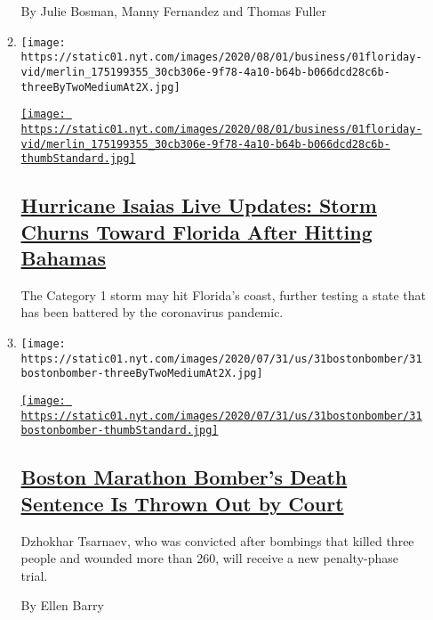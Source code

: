 \begin{enumerate}
\begin{enumerate}
    By Julie Bosman, Manny Fernandez and Thomas Fuller
  \item
    \texttt{[image: https://static01.nyt.com/images/2020/08/01/business/01floriday-vid/merlin\_175199355\_30cb306e-9f78-4a10-b64b-b066dcd28c6b-threeByTwoMediumAt2X.jpg]}

    \href{/2020/08/01/us/hurricane-isaias-updates.html}{\texttt{[image: https://static01.nyt.com/images/2020/08/01/business/01floriday-vid/merlin\_175199355\_30cb306e-9f78-4a10-b64b-b066dcd28c6b-thumbStandard.jpg]}}

    \hypertarget{hurricane-isaias-live-updates-storm-churns-toward-florida-after-hitting-bahamas}{%
    \subsection{\texorpdfstring{\href{/2020/08/01/us/hurricane-isaias-updates.html}{Hurricane
    Isaias Live Updates: Storm Churns Toward Florida After Hitting
    Bahamas}}{Hurricane Isaias Live Updates: Storm Churns Toward Florida After Hitting Bahamas}}\label{hurricane-isaias-live-updates-storm-churns-toward-florida-after-hitting-bahamas}}

    The Category 1 storm may hit Florida's coast, further testing a
    state that has been battered by the coronavirus pandemic.
  \item
    \texttt{[image: https://static01.nyt.com/images/2020/07/31/us/31bostonbomber/31bostonbomber-threeByTwoMediumAt2X.jpg]}

    \href{/2020/07/31/us/dzhokhar-tsarnaev-boston-marathon-bomber.html}{\texttt{[image: https://static01.nyt.com/images/2020/07/31/us/31bostonbomber/31bostonbomber-thumbStandard.jpg]}}

    \hypertarget{boston-marathon-bombers-death-sentence-is-thrown-out-by-court}{%
    \subsection{\texorpdfstring{\href{/2020/07/31/us/dzhokhar-tsarnaev-boston-marathon-bomber.html}{Boston
    Marathon Bomber's Death Sentence Is Thrown Out by
    Court}}{Boston Marathon Bomber's Death Sentence Is Thrown Out by Court}}\label{boston-marathon-bombers-death-sentence-is-thrown-out-by-court}}

    Dzhokhar Tsarnaev, who was convicted after bombings that killed
    three people and wounded more than 260, will receive a new
    penalty-phase trial.

    By Ellen Barry
  \end{enumerate}
\end{enumerate}

